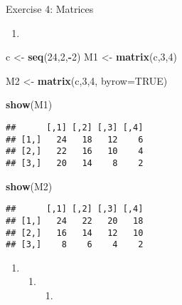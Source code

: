 \documentclass[
]{article}
\newenvironment{Shaded}{\begin{snugshade}}{\end{snugshade}}
\newcommand{\AttributeTok}[1]{\textcolor[rgb]{0.13,0.29,0.53}{#1}}
\newcommand{\ConstantTok}[1]{\textcolor[rgb]{0.56,0.35,0.01}{#1}}
\newcommand{\DecValTok}[1]{\textcolor[rgb]{0.00,0.00,0.81}{#1}}
\newcommand{\FunctionTok}[1]{\textcolor[rgb]{0.13,0.29,0.53}{\textbf{#1}}}
\newcommand{\NormalTok}[1]{#1}
\newcommand{\OtherTok}[1]{\textcolor[rgb]{0.56,0.35,0.01}{#1}}
\newcommand{\SpecialCharTok}[1]{\textcolor[rgb]{0.81,0.36,0.00}{\textbf{#1}}}
\providecommand{\tightlist}{%
  \setlength{\itemsep}{0pt}\setlength{\parskip}{0pt}}
\begin{document}
Exercise 4: Matrices

\begin{enumerate}
\def\labelenumi{\arabic{enumi})}
\tightlist
\item
\end{enumerate}

\begin{Shaded}
\begin{Highlighting}[]
\NormalTok{c }\OtherTok{\textless{}{-}} \FunctionTok{seq}\NormalTok{(}\DecValTok{24}\NormalTok{,}\DecValTok{2}\NormalTok{,}\SpecialCharTok{{-}}\DecValTok{2}\NormalTok{)}
\NormalTok{M1 }\OtherTok{\textless{}{-}} \FunctionTok{matrix}\NormalTok{(c,}\DecValTok{3}\NormalTok{,}\DecValTok{4}\NormalTok{)}

\NormalTok{M2 }\OtherTok{\textless{}{-}} \FunctionTok{matrix}\NormalTok{(c,}\DecValTok{3}\NormalTok{,}\DecValTok{4}\NormalTok{, }\AttributeTok{byrow=}\ConstantTok{TRUE}\NormalTok{)}

\FunctionTok{show}\NormalTok{(M1)}
\end{Highlighting}
\end{Shaded}

\begin{verbatim}
##      [,1] [,2] [,3] [,4]
## [1,]   24   18   12    6
## [2,]   22   16   10    4
## [3,]   20   14    8    2
\end{verbatim}

\begin{Shaded}
\begin{Highlighting}[]
\FunctionTok{show}\NormalTok{(M2)}
\end{Highlighting}
\end{Shaded}

\begin{verbatim}
##      [,1] [,2] [,3] [,4]
## [1,]   24   22   20   18
## [2,]   16   14   12   10
## [3,]    8    6    4    2
\end{verbatim}

\begin{enumerate}
\def\labelenumi{\arabic{enumi})}
\setcounter{enumi}{1}
\item
  \begin{enumerate}
  \def\labelenumii{\arabic{enumii})}
  \setcounter{enumii}{2}
  \item
    \begin{enumerate}
    \def\labelenumiii{\arabic{enumiii})}
    \setcounter{enumiii}{3}
    \tightlist
    \item
    \end{enumerate}
  \end{enumerate}
\end{enumerate}
\end{document}
